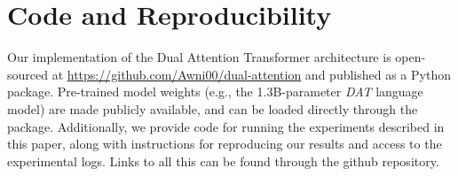 \section*{Code and Reproducibility}

Our implementation of the Dual Attention Transformer architecture is open-sourced at \url{https://github.com/Awni00/dual-attention} and published as a Python package. Pre-trained model weights (e.g., the 1.3B-parameter \textit{DAT} language model) are made publicly available, and can be loaded directly through the package. Additionally, we provide code for running the experiments described in this paper, along with instructions for reproducing our results and access to the experimental logs. Links to all this can be found through the github repository.